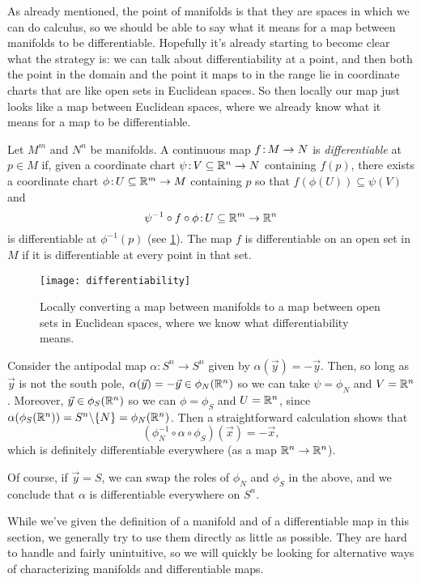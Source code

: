 As already mentioned, the point of manifolds is that they are spaces in which we can do calculus, so we should be able to say what it means for a map between manifolds to be differentiable. Hopefully it's already starting to become clear what the strategy is: we can talk about differentiability at a point, and then both the point in the domain and the point it maps to in the range lie in coordinate charts that are like open sets in Euclidean spaces. So then locally our map just looks like a map between Euclidean spaces, where we already know what it means for a map to be differentiable.

\begin{definition}\label{def:differentiable}
	Let $M^m$ and $N^n$ be manifolds. A continuous map $f\colon\thinspace\!\! M \to N$ is \emph{differentiable} at $p \in M$ if, given a coordinate chart $\psi\colon\thinspace\!\! V \subseteq \mathbb{R}^n \to N$ containing $f(p)$, there exists a coordinate chart $\phi\colon\thinspace\!\! U \subseteq \mathbb{R}^m \to M$ containing $p$ so that $f(\phi(U)) \subseteq \psi(V)$ and 
	\[
		\psi^{-1} \circ f \circ \phi\colon\thinspace\!\! U \subseteq \mathbb{R}^m \to \mathbb{R}^n
	\]
	is differentiable at $\phi^{-1}(p)$ (see \cref{fig:differentiable}). The map $f$ is differentiable on an open set in $M$ if it is differentiable at every point in that set.
\end{definition}

\begin{figure}[htbp]
	\centering
		\texttt{[image: differentiability]}
	\caption{Locally converting a map between manifolds to a map between open sets in Euclidean spaces, where we know what differentiability means.}
	\label{fig:differentiable}
\end{figure}

\begin{example}
	Consider the antipodal map $\alpha : S^n \to S^n$ given by $\alpha(\vec{y}) = -\vec{y}$. Then, so long as $\vec{y}$ is not the south pole, $\alpha(\vec{y}) = -\vec{y} \in \phi_N(\mathbb{R}^n)$ so we can take $\psi = \phi_N$ and $V = \mathbb{R}^n$. Moreover, $\vec{y} \in \phi_S(\mathbb{R}^n)$ so we can $\phi = \phi_S$ and $U = \mathbb{R}^n$, since $\alpha(\phi_S(\mathbb{R}^n)) = S^n \backslash\{N\} = \phi_N(\mathbb{R}^n)$. Then a straightforward calculation shows that
	\[
		(\phi_N^{-1} \circ \alpha \circ \phi_S)(\vec{x}) = -\vec{x},
	\]
	which is definitely differentiable everywhere (as a map $\mathbb{R}^n \to \mathbb{R}^n$). 
	
	Of course, if $\vec{y} = S$, we can swap the roles of $\phi_N$ and $\phi_S$ in the above, and we conclude that $\alpha$ is differentiable everywhere on $S^n$.
\end{example}

While we've given the definition of a manifold and of a differentiable map in this section, we generally try to use them directly as little as possible. They are hard to handle and fairly unintuitive, so we will quickly be looking for alternative ways of characterizing manifolds and differentiable maps.
